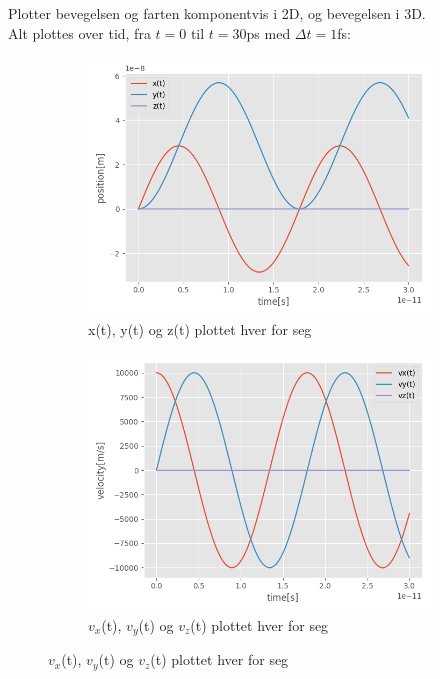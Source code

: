 \documentclass[report,12pt,norsk]{article}
\begin{document}
 Plotter bevegelsen og farten komponentvis i 2D, og bevegelsen i 3D.\\
 Alt plottes over tid, fra $t = 0$ til $t=30$ps med $\Delta t = 1$fs:
 \begin{figure}[h!]
 \centering
 \begin{subfigure}{0.5\textwidth}
        	\centering 
        	\includegraphics[width=\textwidth]{position_plot_2d.png}
       	\caption{x(t), y(t) og z(t) plottet hver for seg}
\end{subfigure}%
 \begin{subfigure}{0.5\textwidth}
        	\centering 
       	\includegraphics[width=\textwidth]{velocity_plot_2d.png}
        	\caption{$v_{x}$(t), $v_{y}$(t) og $v_{z}$(t) plottet hver for seg}
\end{subfigure}
\end{figure}
\end{document}
